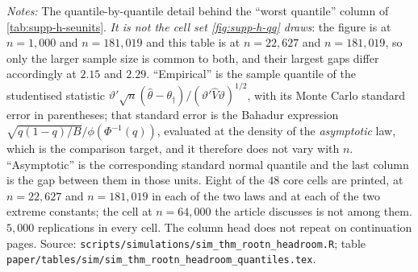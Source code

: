 \documentclass[
  12pt]{article}
\newcommand{\1}[1]{\mathds{1}\left[#1\right]}
\theoremstyle{plain}
\theoremstyle{definition}
\theoremstyle{definition}
\theoremstyle{remark}
\begin{document}
\begingroup
\footnotesize
{}
\label{tab:supp-h-quantiles}
\let\tabular\longtable
\let\endtabular\endlongtable

\addtocounter{table}{-1}
\endgroup
\begingroup\footnotesize
\textit{Notes:} The quantile-by-quantile detail behind the ``worst quantile''
column of \cref{tab:supp-h-seunits}. \emph{It is not the cell set
\cref{fig:supp-h-qq} draws}: the figure is at $n=1{,}000$ and $n=181{,}019$ and
this table is at $n=22{,}627$ and $n=181{,}019$, so only the larger sample size is
common to both, and their largest gaps differ accordingly at $2.15$ and $2.29$.
``Empirical'' is the sample quantile of the
studentised statistic
$\vartheta'\sqrt n(\hat\theta-\theta_\dagger)/(\vartheta'\hat V\vartheta)^{1/2}$,
with its Monte Carlo standard error in parentheses; that standard error is the
Bahadur expression $\sqrt{q(1-q)/B}/\phi(\Phi^{-1}(q))$, evaluated at the density
of the \emph{asymptotic} law, which is the comparison target, and it therefore
does not vary with $n$. ``Asymptotic'' is the corresponding standard normal
quantile and the last column is the gap between them in those units. Eight of the
$48$ core cells are printed, at $n=22{,}627$ and $n=181{,}019$ in each of the two
laws and at each of the two extreme constants; the cell at $n=64{,}000$ the
article discusses is not among them. $5{,}000$ replications in every cell. The column head does not
repeat on continuation pages. Source:
\texttt{scripts/simulations/sim\_thm\_rootn\_headroom.R}; table
\texttt{paper/tables/sim/sim\_thm\_rootn\_headroom\_quantiles.tex}.
\par\endgroup
\end{document}
